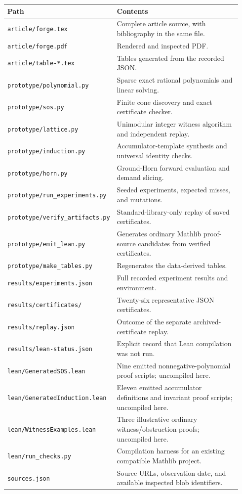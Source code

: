 \documentclass[11pt,a4paper]{article}
\newcommand{\codepath}[1]{\nolinkurl{#1}}
\begin{document}
\begin{small}
\begin{longtable}{@{}p{0.40\linewidth}p{0.54\linewidth}@{}}
\toprule
Path & Contents\\
\midrule
\endhead
\codepath{article/forge.tex} & Complete article source, with bibliography in the same file.\\[3pt]
\codepath{article/forge.pdf} & Rendered and inspected PDF.\\[3pt]
\codepath{article/table-*.tex} & Tables generated from the recorded JSON.\\[3pt]
\codepath{prototype/polynomial.py} & Sparse exact rational polynomials and linear solving.\\[3pt]
\codepath{prototype/sos.py} & Finite cone discovery and exact certificate checker.\\[3pt]
\codepath{prototype/lattice.py} & Unimodular integer witness algorithm and independent replay.\\[3pt]
\codepath{prototype/induction.py} & Accumulator-template synthesis and universal identity checks.\\[3pt]
\codepath{prototype/horn.py} & Ground-Horn forward evaluation and demand slicing.\\[3pt]
\codepath{prototype/run_experiments.py} & Seeded experiments, expected misses, and mutations.\\[3pt]
\codepath{prototype/verify_artifacts.py} & Standard-library-only replay of saved certificates.\\[3pt]
\codepath{prototype/emit_lean.py} & Generates ordinary Mathlib proof-source candidates from verified certificates.\\[3pt]
\codepath{prototype/make_tables.py} & Regenerates the data-derived tables.\\[3pt]
\codepath{results/experiments.json} & Full recorded experiment results and environment.\\[3pt]
\codepath{results/certificates/} & Twenty-six representative JSON certificates.\\[3pt]
\codepath{results/replay.json} & Outcome of the separate archived-certificate replay.\\[3pt]
\codepath{results/lean-status.json} & Explicit record that Lean compilation was not run.\\[3pt]
\codepath{lean/GeneratedSOS.lean} & Nine emitted nonnegative-polynomial proof scripts; uncompiled here.\\[3pt]
\codepath{lean/GeneratedInduction.lean} & Eleven emitted accumulator definitions and invariant proof scripts; uncompiled here.\\[3pt]
\codepath{lean/WitnessExamples.lean} & Three illustrative ordinary witness/obstruction proofs; uncompiled here.\\[3pt]
\codepath{lean/run_checks.py} & Compilation harness for an existing compatible Mathlib project.\\[3pt]
\codepath{sources.json} & Source URLs, observation date, and available inspected blob identifiers.\\
\bottomrule
\end{longtable}
\end{small}
\end{document}
